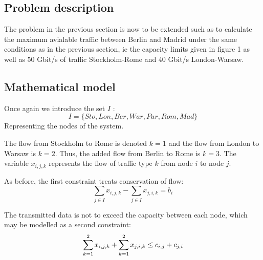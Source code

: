 \subsection{Problem description}

The problem in the previous section is now to be extended such as to calculate the maximum  avialable traffic between Berlin and Madrid under the same conditions as in the previous section, ie the capacity limits given in figure 1 as well as 50 Gbit/s of traffic Stockholm-Rome and 40 Gbit/s London-Warsaw.

\subsection{Mathematical model}
Once again we introduce the set $I$ :
$$I = \{ Sto,Lon,Ber,War,Par,Rom,Mad\}$$
Representing the nodes of the system.

The flow from Stockholm to Rome is denoted $k=1$ and the flow from London to Warsaw is $k=2$. Thus, the added flow from Berlin to Rome is $k=3$. The variable $x_{i,j,k}$ represents the flow of traffic type $k$ from node $i$ to node $j$.

As before, the first constraint treats conservation of flow:
$$\sum\limits_{j \in I} x_{i,j,k} - \sum\limits_{j \in I} x_{j,i,k} = b_{i}$$

The transmitted data is not to exceed the capacity between each node, which may be modelled as a second constraint:
$$\sum\limits_{k =1}^2 x_{i,j,k} + \sum\limits_{k =1}^2 x_{j,i,k} \leq c_{i,j} + c_{j,i}\\$$